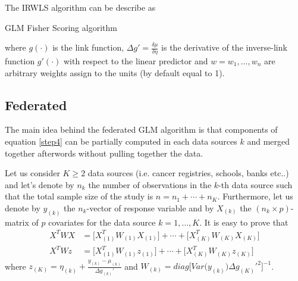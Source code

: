 \documentclass[11pt]{vantage6} %
\begin{document}
The IRWLS algorithm can be describe as

\begin{algorithm}[H]
\caption{GLM Fisher Scoring algorithm}\label{glm_algo}
\end{algorithm}
where $g(\cdot)$ is the link function,  $\Delta g'=\frac{\delta \mu}{\delta \eta}$ is the derivative of the inverse-link function $g'(\cdot)$ with respect to the linear predictor and $w={w_1,\ldots,w_n}$ are arbitrary weights assign to the units (by default equal to 1).

\subsection{Federated}

The main idea behind the federated GLM algorithm is that components of equation \ref{step4} can be partially computed in each data sources $k$ and merged together afterwords without pulling together the data.

Let us consider $K\geq2$ data sources (i.e. cancer registries, schools, banks etc..) and let's denote by $n_k$ the number of observations in the $k$-th data source such that the total sample size of the study is $n=n_1+\cdots+n_K$.
Furthermore, let us denote by $y_{(k)}$ the $n_k$-vector of response variable and by $X_{(k)}$ the $(n_k\times p)$-matrix of $p$ covariates for the data source $k=1,\ldots,K$. It is easy to prove that
\begin{eqnarray*}
X^TWX&=\Big[ X_{(1)}^TW_{(1)}X_{(1)}\Big]+\cdots+\Big[X_{(K)}^TW_{(K)}X_{(K)}\Big] \\
X^TWz&=\Big[ X_{(1)}^TW_{(1)}z_{(1)}\Big]+\cdots+\Big[X_{(K)}^TW_{(K)}z_{(K)}\Big]
\end{eqnarray*}
where $z_{(K)}=\eta_{(k)}+\frac{y_{(k)}-\mu_{(k)}}{\Delta g_{(k)}'}$ and $W_{(k)}=diag \Big[ Var\big(y_{(k)}\big) \Delta g_{(K)}'^2 \Big]^{-1}$.
\end{document}
